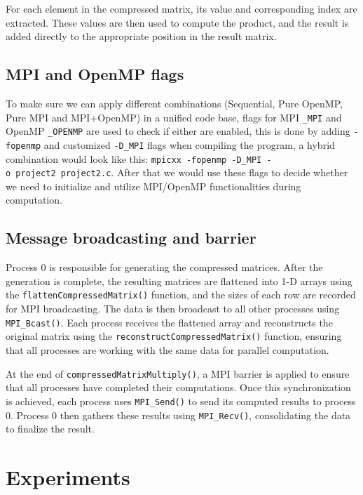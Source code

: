 \documentclass[
]{article}
\begin{document}
For each element in the compressed matrix, its value and corresponding
index are extracted. These values are then used to compute the product,
and the result is added directly to the appropriate position in the
result matrix.

\subsection{MPI and OpenMP flags}\label{mpi-and-openmp-flags}

To make sure we can apply different combinations (Sequential, Pure
OpenMP, Pure MPI and MPI+OpenMP) in a unified code base, flags for MPI
\texttt{\_MPI} and OpenMP \texttt{\_OPENMP} are used to check if either
are enabled, this is done by adding \texttt{-fopenmp} and customized
\texttt{-D\_MPI} flags when compiling the program, a hybrid combination
would look like this:
\texttt{mpicxx\ -fopenmp\ -D\_MPI\ -o\ project2\ project2.c}. After that
we would use these flags to decide whether we need to initialize and
utilize MPI/OpenMP functionalities during computation.

\subsection{Message broadcasting and
barrier}\label{message-broadcasting-and-barrier}

Process 0 is responsible for generating the compressed matrices. After
the generation is complete, the resulting matrices are flattened into
1-D arrays using the \texttt{flattenCompressedMatrix()} function, and
the sizes of each row are recorded for MPI broadcasting. The data is
then broadcast to all other processes using \texttt{MPI\_Bcast()}. Each
process receives the flattened array and reconstructs the original
matrix using the \texttt{reconstructCompressedMatrix()} function,
ensuring that all processes are working with the same data for parallel
computation.

At the end of \texttt{compressedMatrixMultiply()}, a MPI barrier is
applied to ensure that all processes have completed their computations.
Once this synchronization is achieved, each process uses
\texttt{MPI\_Send()} to send its computed results to process 0. Process
0 then gathers these results using \texttt{MPI\_Recv()}, consolidating
the data to finalize the result.

\vspace{0.5cm}

\section{Experiments}\label{experiments}
\end{document}

